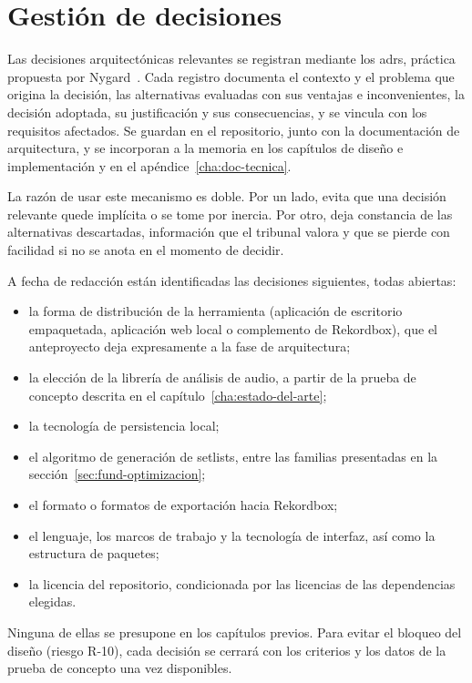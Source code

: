 \section{Gestión de decisiones}
\label{sec:met-adr}

Las decisiones arquitectónicas relevantes se registran mediante los \acsp{adr}, práctica propuesta por Nygard~\cite{nygard2011adr}. Cada registro documenta el contexto y el problema que origina la decisión, las alternativas evaluadas con sus ventajas e inconvenientes, la decisión adoptada, su justificación y sus consecuencias, y se vincula con los requisitos afectados. Se guardan en el repositorio, junto con la documentación de arquitectura, y se incorporan a la memoria en los capítulos de diseño e implementación y en el apéndice~\ref{cha:doc-tecnica}.

La razón de usar este mecanismo es doble. Por un lado, evita que una decisión relevante quede implícita o se tome por inercia. Por otro, deja constancia de las alternativas descartadas, información que el tribunal valora y que se pierde con facilidad si no se anota en el momento de decidir.

A fecha de redacción están identificadas las decisiones siguientes, todas abiertas:
\begin{itemize}
  \item la forma de distribución de la herramienta (aplicación de escritorio empaquetada, aplicación web local o complemento de Rekordbox), que el anteproyecto deja expresamente a la fase de arquitectura;
  \item la elección de la librería de análisis de audio, a partir de la prueba de concepto descrita en el capítulo~\ref{cha:estado-del-arte};
  \item la tecnología de persistencia local;
  \item el algoritmo de generación de setlists, entre las familias presentadas en la sección~\ref{sec:fund-optimizacion};
  \item el formato o formatos de exportación hacia Rekordbox;
  \item el lenguaje, los marcos de trabajo y la tecnología de interfaz, así como la estructura de paquetes;
  \item la licencia del repositorio, condicionada por las licencias de las dependencias elegidas.
\end{itemize}
Ninguna de ellas se presupone en los capítulos previos. Para evitar el bloqueo del diseño (riesgo R-10), cada decisión se cerrará con los criterios y los datos de la prueba de concepto una vez disponibles.








